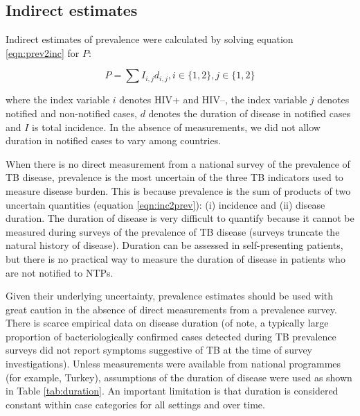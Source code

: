\subsection{Indirect estimates}
Indirect estimates of prevalence were calculated by solving equation \ref{eqn:prev2inc} for $P$:

\begin{equation}
P = \sum I_{i,j} d_{i,j}, i \in \lbrace 1, 2\rbrace, j \in \lbrace 1, 2\rbrace
\label{eqn:inc2prev}
\end{equation}

where the index variable $i$ denotes HIV+ and HIV–, the index variable $j$ denotes notified and non-notified cases, $d$ denotes the duration of disease in notified cases and $I$ is total incidence. In the absence of measurements, we did not allow duration in notified cases to vary among countries. 

When there is no direct measurement from a national survey of the prevalence of TB disease, prevalence is the most uncertain of the three TB indicators used to measure disease burden. This is because prevalence is the sum of products of two uncertain quantities (equation \ref{eqn:inc2prev}): (i) incidence and (ii) disease duration. The duration of disease is very difficult to quantify because it cannot be measured during surveys of the prevalence of TB disease (surveys truncate the natural history of disease). Duration can be assessed in self-presenting patients, but there is no practical way to measure the duration of disease in patients who are not notified to NTPs.

Given their underlying uncertainty, prevalence estimates should be used with great caution in the absence of direct measurements from a prevalence survey. There is scarce empirical data on disease duration (of note, a typically large proportion of bacteriologically confirmed cases detected during TB prevalence surveys did not report symptoms suggestive of TB at the time of survey investigations). Unless measurements were available from national programmes (for example, Turkey), assumptions of the duration of disease were used as shown in Table \ref{tab:duration}. An important limitation is that duration is considered constant within case categories for all settings and over time.